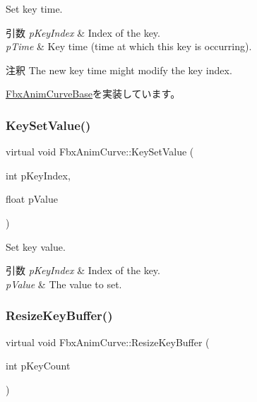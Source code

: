 Set key time. 
\begin{DoxyParams}{引数}
{\em p\+Key\+Index} & Index of the key. \\
\hline
{\em p\+Time} & Key time (time at which this key is occurring). \\
\hline
\end{DoxyParams}
\begin{DoxyRemark}{注釈}
The new key time might modify the key index. 
\end{DoxyRemark}


\hyperlink{class_fbx_anim_curve_base_afce0ede7336b9639c1e7ac08adf3e6df}{Fbx\+Anim\+Curve\+Base}を実装しています。

\mbox{\label{class_fbx_anim_curve_aa974a3bbece0cd63fa4c4d3a7ad7fd99}} 
\subsubsection{\texorpdfstring{Key\+Set\+Value()}{KeySetValue()}}
{\footnotesize\ttfamily virtual void Fbx\+Anim\+Curve\+::\+Key\+Set\+Value (\begin{DoxyParamCaption}\item[{int}]{p\+Key\+Index,  }\item[{float}]{p\+Value }\end{DoxyParamCaption})\hspace{0.3cm}{\ttfamily [pure virtual]}}

Set key value. 
\begin{DoxyParams}{引数}
{\em p\+Key\+Index} & Index of the key. \\
\hline
{\em p\+Value} & The value to set. \\
\hline
\end{DoxyParams}
\mbox{\label{class_fbx_anim_curve_ad116802320381f4217d32dde6006643b}} 
\subsubsection{\texorpdfstring{Resize\+Key\+Buffer()}{ResizeKeyBuffer()}}
{\footnotesize\ttfamily virtual void Fbx\+Anim\+Curve\+::\+Resize\+Key\+Buffer (\begin{DoxyParamCaption}\item[{int}]{p\+Key\+Count }\end{DoxyParamCaption})\hspace{0.3cm}{\ttfamily [pure virtual]}}

